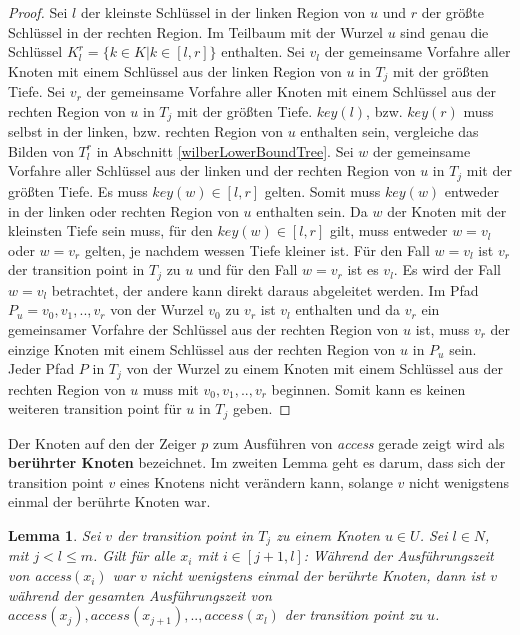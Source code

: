 \documentclass[a4paper,12pt]{article}
\newtheorem{Lemma}{Lemma}[section]
\begin{document}
\begin{proof}
	Sei $l$ der kleinste Schlüssel in der linken Region von $u$ und $r$ der größte Schlüssel in der rechten Region. Im Teilbaum mit der Wurzel $u$ sind genau die Schlüssel $K^r_l = \{k \in K \vert k \in \left[l,r\right]\}$ enthalten. Sei $v_l$ der gemeinsame Vorfahre aller Knoten mit einem Schlüssel aus der linken Region von $u$ in $T_j$ mit der größten Tiefe. Sei $v_r$ der gemeinsame Vorfahre aller Knoten mit einem Schlüssel aus der rechten Region von $u$ in $T_j$ mit der größten Tiefe. $\mathit{key\left(l\right)}$, bzw. $\mathit{key\left(r\right)}$ muss selbst in der linken, bzw. rechten Region von $u$ enthalten sein, vergleiche das Bilden von $T^r_l$ in Abschnitt \ref{wilberLowerBoundTree}. Sei $w$ der gemeinsame Vorfahre aller Schlüssel aus der linken und der rechten Region von $u$ in $T_j$ mit der größten Tiefe. Es muss $\mathit{key}\left(w\right) \in \left[l,r\right]$ gelten. Somit muss  $\mathit{key}\left(w\right)$ entweder in der linken oder rechten Region von $u$ enthalten sein. Da $w$ der Knoten mit der kleinsten Tiefe sein muss, für den  $\mathit{key\left(w\right)} \in \left[l,r\right]$  gilt, muss entweder $w = v_l$ oder $w = v_r$ gelten, je nachdem wessen Tiefe kleiner ist. Für den Fall $w = v_l$ ist $v_r$ der transition point in $T_j$ zu $u$ und für den Fall $w = v_r$ ist es $v_l$.
	Es wird der Fall $w = v_l$ betrachtet, der andere kann direkt daraus abgeleitet werden. Im Pfad $P_u = v_0,v_1,..,v_r$ von der Wurzel $v_0$ zu $v_r$ ist $v_l$ enthalten und da $v_r$ ein gemeinsamer Vorfahre der Schlüssel aus der rechten Region von $u$ ist, muss $v_r$ der einzige Knoten mit einem Schlüssel aus der rechten Region von $u$ in $P_u$ sein. Jeder Pfad $P$ in $T_j$ von der Wurzel zu einem Knoten mit einem Schlüssel aus der rechten Region von $u$ muss mit $v_0,v_1,..,v_r$ beginnen. Somit kann es keinen weiteren transition point für $u$ in $T_j$ geben. 
	
\end{proof}
\noindent Der Knoten auf den der Zeiger $p$ zum Ausführen von \textit{access} gerade zeigt wird als \textbf{berührter Knoten} bezeichnet.
Im zweiten Lemma geht es darum, dass sich der transition point $v$ eines Knotens nicht verändern kann, solange $v$ nicht wenigstens einmal der berührte Knoten war.



\begin{Lemma} \label{demaineLemma2} \label{lemmaDemaine2}
 Sei $v$ der transition point in $T_j$ zu einem Knoten $u \in U$.  Sei  \mbox{$l \in \mathit{N}$}, mit \mbox{$j < l \leq m$}. Gilt für alle $x_i$ mit $i \in \left[j + 1,l\right]$: Während der Ausführungszeit von \textit{access}$\left(x_i\right)$ war  $v$  nicht wenigstens einmal der berührte Knoten, dann ist $v$ während der gesamten Ausführungszeit von\\ $\textit{access}\left(x_j\right),\textit{access}\left(x_{j+1}\right),..,\textit{access}\left(x_l\right)$ der transition point zu $u$. 
\end{Lemma}
\end{document}
